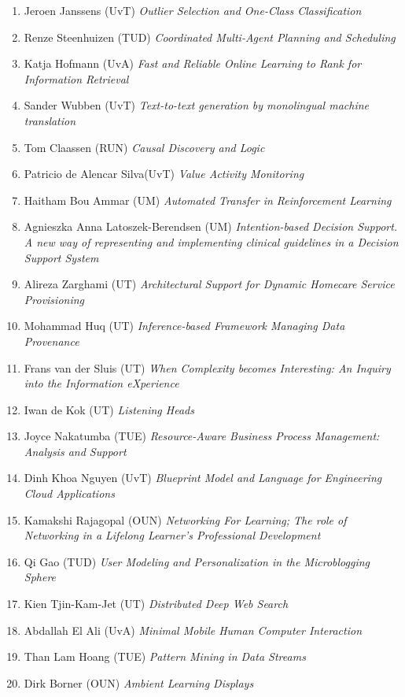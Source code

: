\begin{multicols}{2}
\begin{scriptsize}
\begin{enumerate}[leftmargin=*,noitemsep,topsep=0pt,parsep=1pt,partopsep=0pt]
{}\item Jeroen Janssens (UvT) \textit{Outlier Selection and One-Class Classification
}\item Renze Steenhuizen (TUD) \textit{Coordinated Multi-Agent Planning and Scheduling
}\item Katja Hofmann (UvA) \textit{Fast and Reliable Online Learning to Rank for Information Retrieval
}\item Sander Wubben (UvT) \textit{Text-to-text generation by monolingual machine translation
}\item Tom Claassen (RUN) \textit{Causal Discovery and Logic
}\item Patricio de Alencar Silva(UvT) \textit{Value Activity Monitoring
}\item Haitham Bou Ammar (UM) \textit{Automated Transfer in Reinforcement Learning
}\item Agnieszka Anna Latoszek-Berendsen (UM) \textit{Intention-based Decision Support. A new way of representing and implementing clinical guidelines in a Decision Support System
}\item Alireza Zarghami (UT) \textit{Architectural Support for Dynamic Homecare Service Provisioning
}\item Mohammad Huq (UT) \textit{Inference-based Framework Managing Data Provenance
}\item Frans van der Sluis (UT) \textit{When Complexity becomes Interesting: An Inquiry into the Information eXperience
}\item Iwan de Kok (UT) \textit{Listening Heads
}\item Joyce Nakatumba (TUE) \textit{Resource-Aware Business Process Management: Analysis and Support
}\item Dinh Khoa Nguyen (UvT) \textit{Blueprint Model and Language for Engineering Cloud Applications
}\item Kamakshi Rajagopal (OUN) \textit{Networking For Learning; The role of Networking in a Lifelong Learner's Professional Development
}\item Qi Gao (TUD) \textit{User Modeling and Personalization in the Microblogging Sphere
}\item Kien Tjin-Kam-Jet (UT) \textit{Distributed Deep Web Search
}\item Abdallah El Ali (UvA) \textit{Minimal Mobile Human Computer Interaction
}\item Than Lam Hoang (TUE) \textit{Pattern Mining in Data Streams
}\item Dirk Borner (OUN) \textit{Ambient Learning Displays
}
\end{enumerate}
\end{scriptsize}
\end{multicols}
